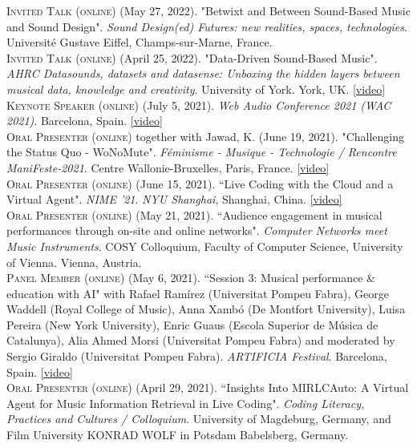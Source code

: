 \documentclass[10pt, a4paper]{article}
\newcommand{\years}[1]{\marginnote{\scriptsize #1}}
\begin{document}
\years{2022b} \textsc{Invited Talk (online)} (May 27, 2022). "Betwixt and Between Sound-Based Music and Sound Design". \emph{Sound Design(ed) Futures: new realities, spaces, technologies}. Université Gustave Eiffel, Champs-sur-Marne, France.\\ 
\years{2022a} \textsc{Invited Talk (online)} (April 25, 2022). "Data-Driven Sound-Based Music". \emph{AHRC Datasounds, datasets and datasense: Unboxing the hidden layers between musical data, knowledge and creativity}. University of York. York, UK. \href{https://youtu.be/8ootXx1csJQ}{[video]}\\ 
\years{2021h} \textsc{Keynote Speaker (online)} (July 5, 2021). \emph{Web Audio Conference 2021 (WAC 2021)}. Barcelona, Spain. \href{https://youtu.be/7SWu3txbg-w}{[video]}\\ 
\years{2021g} \textsc{Oral Presenter (online)} together with Jawad, K.  (June 19, 2021). "Challenging the Status Quo - WoNoMute". \emph{Féminisme - Musique - Technologie / Rencontre ManiFeste-2021}. Centre Wallonie-Bruxelles, Paris, France. \href{https://youtu.be/jXmNvd9ty_o}{[video]}\\
\years{2021f} \textsc{Oral Presenter (online)} (June 15, 2021). “Live Coding with the Cloud and a Virtual Agent". \emph{NIME '21}. 
\emph{NYU Shanghai}, Shanghai, China. \href{https://youtu.be/F4UoH1hRMoU}{[video]}\\
\years{2021e} \textsc{Oral Presenter (online)} (May 21, 2021). “Audience engagement in musical performances through on-site and online networks". \emph{Computer Networks meet Music Instruments}. COSY Colloquium, Faculty of Computer Science, University of Vienna. Vienna, Austria.\\ 
\years{2021d} \textsc{Panel Member (online)} (May 6, 2021). “Session 3: Musical performance \& education with AI" with Rafael Ramírez (Universitat Pompeu Fabra), George Waddell (Royal College of Music), Anna Xambó (De Montfort University), Luisa Pereira (New York University), Enric Guaus (Escola Superior de Música de Catalunya), Alia Ahmed Morsi (Universitat Pompeu Fabra) and moderated by Sergio Giraldo (Universitat Pompeu Fabra). \emph{ARTIFICIA Festival}. Barcelona, Spain. \href{https://youtu.be/o0arHV4s6Mo}{[video]}\\ 
\years{2021c} \textsc{Oral Presenter (online)} (April 29, 2021). “Insights Into MIRLCAuto: A Virtual Agent for Music Information Retrieval in Live Coding". \emph{Coding Literacy, Practices and Cultures / Colloquium}. University of Magdeburg, Germany, and Film University KONRAD WOLF in Potsdam Babelsberg, Germany.\\ 
\end{document}
